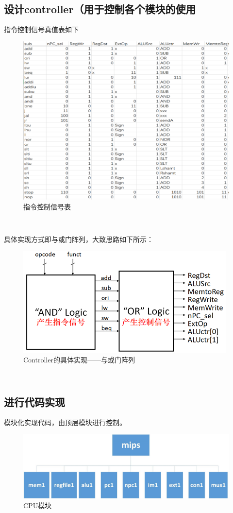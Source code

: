 \documentclass[UTF8]{article}
\begin{document}
\subsection{设计controller（用于控制各个模块的使用}

指令控制信号真值表如下
\begin{figure}[H]
    \centering
    \includegraphics[width=\linewidth]{3.png}
    \caption{指令控制信号表}
    \label{FIG4}
\end{figure}​​

具体实现方式即与或门阵列，大致思路如下所示：
\begin{figure}[H]
    \centering
    \includegraphics[width=\linewidth]{4.png}
    \caption{Controller的具体实现——与或门阵列}
    \label{FIG5}
\end{figure}

​​
\subsection{进行代码实现}
模块化实现代码，由顶层模块进行控制。
\begin{figure}[H]
    \centering
    \includegraphics[width=\linewidth]{8.jpg}
    \caption{CPU模块}
    \label{FIG7}
\end{figure}
\end{document}
